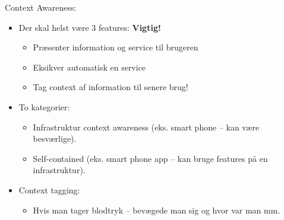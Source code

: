 \documentclass[oneside, 10pt]{article}
\begin{document}
Context Awareness: 
\begin{itemize}
	\item Der skal helst være 3 features: \textbf{Vigtig!}
	\begin{itemize}
		\item Præsenter information og service til brugeren
		\item Eksikver automatisk en service
		\item Tag context af information til senere brug!
	\end{itemize}
	\item To kategorier:
	\begin{itemize}
		\item Infrastruktur context awareness (eks. smart phone -- kan være besværlige).
		\item Self-contained (eks. smart phone app -- kan bruge features på en infrastruktur).
	\end{itemize}
	\item Context tagging:
	\begin{itemize}
		\item Hvis man tager blodtryk -- bevægede man sig og hvor var man mm.
	\end{itemize}
\end{itemize}
\end{document}
